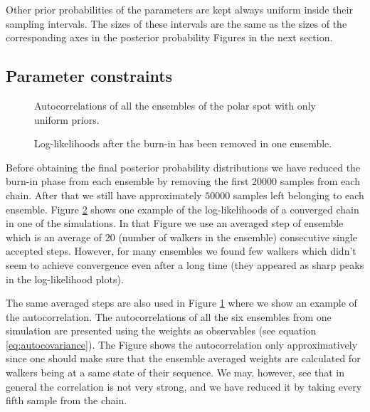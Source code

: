 \documentclass{wihuri}
\begin{document}
Other prior probabilities of the parameters are kept always uniform inside their sampling intervals. The sizes of these intervals are the same as the sizes of the corresponding axes in the posterior probability Figures in the next section. 



\subsection{Parameter constraints}

\begin{figure}
\centerline{}
\caption{Autocorrelations of all the ensembles of the polar spot with only uniform priors.
\label{fig:acexample}}
\end{figure}


\begin{figure}
\centerline{}
\caption{Log-likelihoods after the burn-in has been removed in one ensemble.
\label{fig:wexample}}
\end{figure}

Before obtaining the final posterior probability distributions we have reduced the burn-in phase from each ensemble by removing the first $20 000$ samples from each chain. After that we still have approximately $50 000$ samples left belonging to each ensemble.  Figure \ref{fig:wexample} shows one example of the log-likelihoods of a converged chain in one of the simulations. In that Figure we use an averaged step of ensemble which is an average of $20$ (number of walkers in the ensemble) consecutive single accepted steps. However, for many ensembles we found few walkers which didn't seem to achieve convergence even after a long time (they appeared as sharp peaks in the log-likelihood plots).

The same averaged steps are also used in Figure \ref{fig:acexample} where we show an example of the autocorrelation. The autocorrelations of all the six ensembles from one simulation are presented using the weights as observables (see equation \ref{eq:autocovariance}). The Figure shows the autocorrelation only approximatively since one should make sure that the ensemble averaged weights are calculated for walkers being at a same state of their sequence. We may, however, see that in general the correlation is not very strong, and we have reduced it by taking every fifth sample from the chain.%
\end{document}
